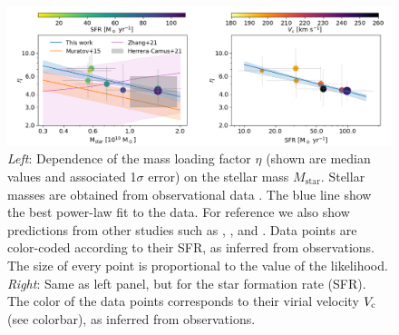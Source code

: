 \documentclass[a4paper, 12pt]{article}
\begin{document}
\begin{figure}
	\centering
	\includegraphics[width=1.0\textwidth]{plots/final_comparison_new_paper.png}
    \caption{\textit{Left}: Dependence of the mass loading factor $\eta$ (shown are median values and associated 1$\sigma$ error) on the stellar mass $M_\mathrm{star}$. Stellar masses are obtained from observational data \citep{Fujimoto:2020qzo}. The blue line show the best power-law fit to the data. For reference we also show predictions from other studies such as \citet[][orange]{muratov2015}, \citet[][purple]{zhang2021empirical}, and \citet[][grey rectangle]{herrera2021kiloparsec}. Data points are color-coded according to their SFR, as inferred from observations. The size of every point is proportional to the value of the likelihood. \textit{Right}: Same as left panel, but for the star formation rate (SFR). The color of the data points corresponds to their virial velocity $V_{\rm c}$ (see colorbar), as inferred from observations.
    \label{fig:final}
	}
\end{figure}


\newpage

\end{document}
